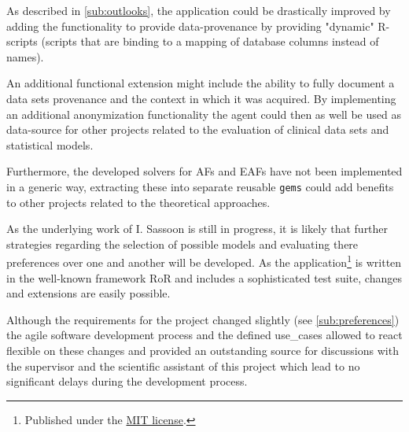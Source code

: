 As described in \autoref{sub:outlooks}, the application could be drastically improved by adding the functionality to provide data-provenance by providing "dynamic" \gls{R}-scripts (scripts that are binding to a mapping of database columns instead of names). 

An additional functional extension might include the ability to fully document a data sets provenance and the context in which it was acquired. By implementing an additional anonymization functionality the agent could then as well be used as data-source for other projects related to the evaluation of clinical data sets and statistical models.

Furthermore, the developed solvers for \glspl{AF} and \glspl{EAF} have not been implemented in a generic way, extracting these into separate reusable \texttt{gems} could add benefits to other projects related to the theoretical approaches.

As the underlying work of I. Sassoon \cite{sassoon2016CD} is still in progress, it is likely that further strategies regarding the selection of possible models and evaluating there preferences over one and another will be developed. As the application\footnote{Published under the \href{https://opensource.org/licenses/MIT}{MIT license}.} is written in the well-known framework \gls{RoR} and includes a sophisticated test suite, changes and extensions are easily possible.
 
Although the requirements for the project changed slightly (see \autoref{sub:preferences}) the agile software development process and the defined \glspl{use_case} allowed to react flexible on these changes and provided an outstanding source for discussions with the supervisor and the scientific assistant of this project which lead to no significant delays during the development process.